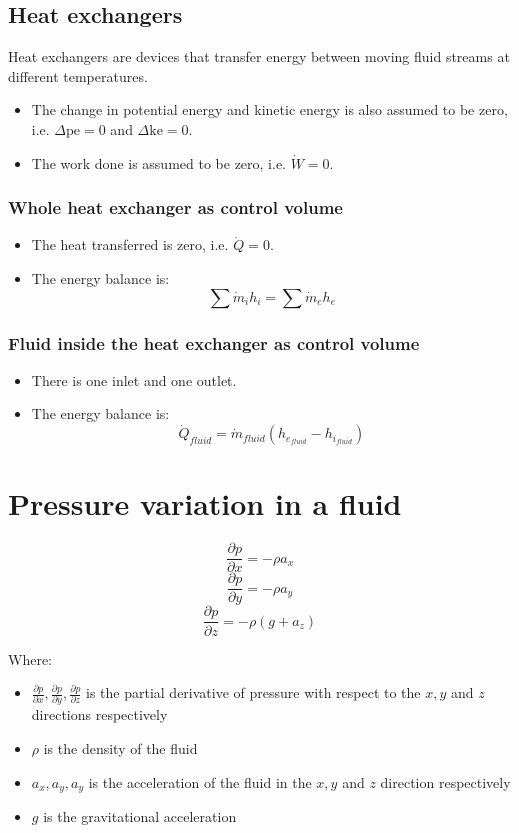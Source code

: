 \documentclass[11pt]{article}
\begin{document}
\subsection{Heat exchangers}
\label{sec:org583d0ca}
Heat exchangers are devices that transfer energy between moving fluid streams at different temperatures.
\begin{itemize}
\item The change in potential energy and kinetic energy is also assumed to be zero, i.e. \(\Delta \text{pe} = 0\) and \(\Delta \text{ke} = 0\).
\item The work done is assumed to be zero, i.e. \(\dot{W} = 0\).
\end{itemize}

\subsubsection{Whole heat exchanger as control volume}
\label{sec:org059edb8}
\begin{itemize}
\item The heat transferred is zero, i.e. \(\dot{Q} = 0\).
\item The energy balance is:
\[\sum \dot{m}_i h_i = \sum \dot{m}_e h_e\]
\end{itemize}

\subsubsection{Fluid inside the heat exchanger as control volume}
\label{sec:org3aeca58}
\begin{itemize}
\item There is one inlet and one outlet.
\item The energy balance is:
\[\dot{Q}_{fluid} = \dot{m}_{fluid} \left(h_{e_{fluid}} - h_{i_{fluid}} \right)\]
\end{itemize}


\section{Pressure variation in a fluid}
\label{sec:org8a6889f}
\[\frac{\partial p}{\partial x} = - \rho a_x\]
\[\frac{\partial p}{\partial y} = - \rho a_y\]
\[\frac{\partial p}{\partial z} = - \rho (g + a_z)\]

Where:
\begin{itemize}
\item \(\frac{\partial p}{\partial x}, \frac{\partial p}{\partial y}, \frac{\partial p}{\partial z}\) is the partial derivative of pressure with respect to the \(x, y\) and \(z\) directions respectively
\item \(\rho\) is the density of the fluid
\item \(a_x, a_y, a_y\) is the acceleration of the fluid in the \(x, y\) and \(z\) direction respectively
\item \(g\) is the gravitational acceleration
\end{itemize}
\end{document}
